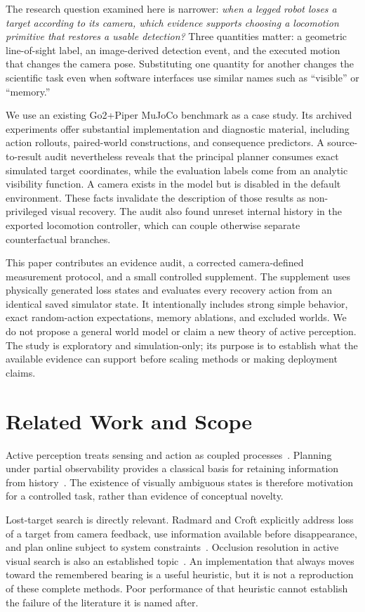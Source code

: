 \documentclass[10pt,twocolumn,a4paper]{article}
\begin{document}
The research question examined here is narrower: \emph{when a legged robot loses a target according to its camera, which evidence supports choosing a locomotion primitive that restores a usable detection?} Three quantities matter: a geometric line-of-sight label, an image-derived detection event, and the executed motion that changes the camera pose. Substituting one quantity for another changes the scientific task even when software interfaces use similar names such as ``visible'' or ``memory.''

We use an existing Go2+Piper MuJoCo benchmark as a case study. Its archived experiments offer substantial implementation and diagnostic material, including action rollouts, paired-world constructions, and consequence predictors. A source-to-result audit nevertheless reveals that the principal planner consumes exact simulated target coordinates, while the evaluation labels come from an analytic visibility function. A camera exists in the model but is disabled in the default environment. These facts invalidate the description of those results as non-privileged visual recovery. The audit also found unreset internal history in the exported locomotion controller, which can couple otherwise separate counterfactual branches.

This paper contributes an evidence audit, a corrected camera-defined measurement protocol, and a small controlled supplement. The supplement uses physically generated loss states and evaluates every recovery action from an identical saved simulator state. It intentionally includes strong simple behavior, exact random-action expectations, memory ablations, and excluded worlds. We do not propose a general world model or claim a new theory of active perception. The study is exploratory and simulation-only; its purpose is to establish what the available evidence can support before scaling methods or making deployment claims.

\section{Related Work and Scope}
Active perception treats sensing and action as coupled processes~\cite{bajcsy}. Planning under partial observability provides a classical basis for retaining information from history~\cite{pomdp}. The existence of visually ambiguous states is therefore motivation for a controlled task, rather than evidence of conceptual novelty.

Lost-target search is directly relevant. Radmard and Croft explicitly address loss of a target from camera feedback, use information available before disappearance, and plan online subject to system constraints~\cite{radmard}. Occlusion resolution in active visual search is also an established topic~\cite{radmard2018}. An implementation that always moves toward the remembered bearing is a useful heuristic, but it is not a reproduction of these complete methods. Poor performance of that heuristic cannot establish the failure of the literature it is named after.
\end{document}

